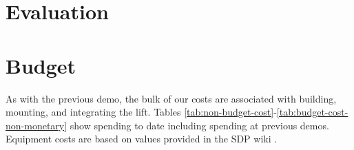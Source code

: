 \documentclass{article}
\begin{document}
\section{Evaluation}

\section{Budget}
As with the previous demo, the bulk of our costs are associated with building, mounting, and integrating the lift. Tables \ref{tab:non-budget-cost}-\ref{tab:budget-cost-non-monetary} show spending to date including spending at previous demos. Equipment costs are based on values provided in the SDP wiki \cite{sdpcosts}.

\begin{table}[h]
\begin{center}
\caption{Non-budgeted monetary costs at demo \demoNumber. Note that we have chosen to stop using the EV3 and instead use the Arduino kit.}
\label{tab:non-budget-cost}
\end{center}
\end{table}
\end{document}
